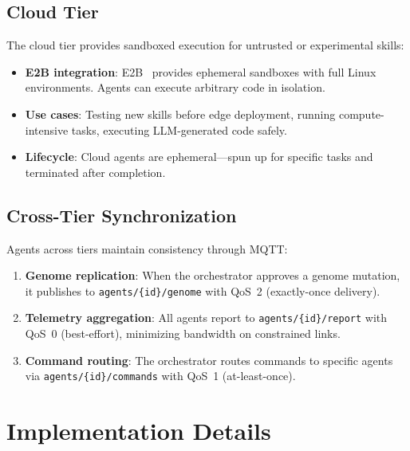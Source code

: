\documentclass{article}
\newcommand{\topic}[1]{\texttt{#1}}
\begin{document}
\subsection{Cloud Tier}

The cloud tier provides sandboxed execution for untrusted or experimental skills:

\begin{itemize}[leftmargin=*]
    \item \textbf{E2B integration}: E2B~\cite{e2b} provides ephemeral sandboxes with full Linux environments. Agents can execute arbitrary code in isolation.
    \item \textbf{Use cases}: Testing new skills before edge deployment, running compute-intensive tasks, executing LLM-generated code safely.
    \item \textbf{Lifecycle}: Cloud agents are ephemeral---spun up for specific tasks and terminated after completion.
\end{itemize}


\subsection{Cross-Tier Synchronization}

Agents across tiers maintain consistency through MQTT:

\begin{enumerate}[leftmargin=*]
    \item \textbf{Genome replication}: When the orchestrator approves a genome mutation, it publishes to \topic{agents/\{id\}/genome} with QoS~2 (exactly-once delivery).
    \item \textbf{Telemetry aggregation}: All agents report to \topic{agents/\{id\}/report} with QoS~0 (best-effort), minimizing bandwidth on constrained links.
    \item \textbf{Command routing}: The orchestrator routes commands to specific agents via \topic{agents/\{id\}/commands} with QoS~1 (at-least-once).
\end{enumerate}



\section{Implementation Details}
\label{sec:implementation}
\end{document}
